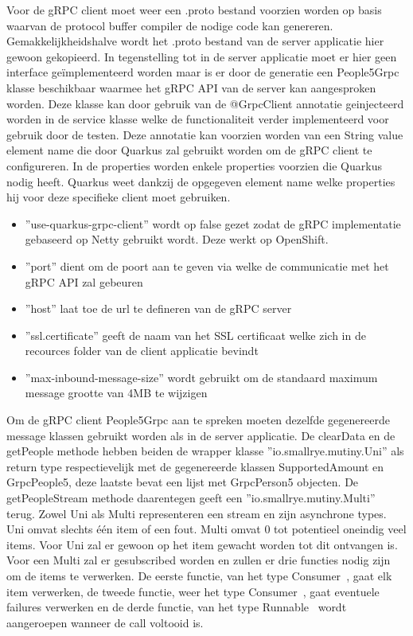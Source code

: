 Voor de gRPC client moet weer een .proto bestand voorzien worden op basis waarvan de protocol buffer compiler de nodige code kan genereren. Gemakkelijkheidshalve wordt het
.proto bestand van de server applicatie hier gewoon gekopieerd. In tegenstelling tot in de server applicatie moet er hier geen interface geïmplementeerd worden maar
is er door de generatie een People5Grpc klasse beschikbaar waarmee het gRPC API van de server kan aangesproken worden. Deze klasse kan door gebruik van de
@GrpcClient annotatie geinjecteerd worden in de service klasse welke de functionaliteit verder implementeerd voor gebruik door de testen. Deze annotatie
kan voorzien worden van een String value element name die door Quarkus zal gebruikt worden om de gRPC client te configureren. In de properties worden enkele properties voorzien
die Quarkus nodig heeft. Quarkus weet dankzij de opgegeven element name welke properties hij voor deze specifieke client moet gebruiken.\newline

\begin{itemize}
    \item ''use-quarkus-grpc-client'' wordt op false gezet zodat de gRPC implementatie gebaseerd op Netty gebruikt wordt. Deze werkt op OpenShift.
    \item ''port'' dient om de poort aan te geven via welke de communicatie met het gRPC API zal gebeuren
    \item ''host'' laat toe de url te defineren van de gRPC server
    \item ''ssl.certificate'' geeft de naam van het SSL certificaat welke zich in de recources folder van de client applicatie bevindt
    \item ''max-inbound-message-size'' wordt gebruikt om de standaard maximum message grootte van 4MB te wijzigen
\end{itemize}

Om de gRPC client People5Grpc aan te spreken moeten dezelfde gegenereerde message klassen gebruikt worden als in de server applicatie.
De clearData en de getPeople methode hebben beiden de wrapper klasse ''io.smallrye.mutiny.Uni'' als return type respectievelijk met de gegenereerde klassen
SupportedAmount en GrpcPeople5, deze laatste bevat een lijst met GrpcPerson5 objecten. De getPeopleStream methode daarentegen geeft een ''io.smallrye.mutiny.Multi'' terug.
Zowel Uni als Multi representeren een stream en zijn asynchrone types. Uni omvat slechts \'e\'en item of een fout. Multi omvat 0 tot potentieel oneindig veel items.
Voor Uni zal er gewoon op het item gewacht worden tot dit ontvangen is. Voor een Multi zal er gesubscribed worden en zullen er drie functies nodig zijn om
de items te verwerken. De eerste functie, van het type Consumer~\parencite{Consumer}, gaat elk item verwerken, de tweede functie, weer het type Consumer~\parencite{Consumer},
gaat eventuele failures verwerken en de derde functie, van het type Runnable~\parencite{Runnable} wordt aangeroepen wanneer de call voltooid is.\newline


